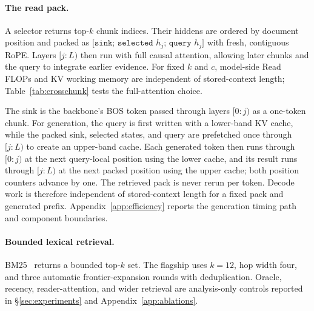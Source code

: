 \paragraph{The read pack.} A selector returns top-$k$ chunk indices. Their
hiddens are ordered by document position and packed as
$\texttt{[sink; selected }h_j\texttt{; query }h_j\texttt{]}$ with fresh,
contiguous RoPE. Layers $[j{:}L)$ then run with full causal attention, allowing
later chunks and the query to integrate earlier evidence. For fixed $k$ and $c$,
model-side Read FLOPs and KV working memory are independent of stored-context
length; Table~\ref{tab:crosschunk} tests the full-attention choice.

The sink is the backbone's BOS token passed through layers $[0{:}j)$ as a
one-token chunk. For generation, the query is first written with a lower-band KV
cache, while the packed sink, selected states, and query are prefetched once
through $[j{:}L)$ to create an upper-band cache. Each generated token then runs
through $[0{:}j)$ at the next query-local position using the lower cache, and its
result runs through $[j{:}L)$ at the next packed position using the upper cache;
both position counters advance by one. The retrieved pack is never rerun per
token. Decode work is therefore independent of stored-context length for a fixed
pack and generated prefix. Appendix~\ref{app:efficiency} reports the generation
timing path and component boundaries.

\paragraph{Bounded lexical retrieval.} BM25~\citep{bm25} returns a bounded
top-$k$ set. The flagship uses $k{=}12$, hop width four, and three automatic
frontier-expansion
rounds with deduplication. Oracle, recency, reader-attention, and wider retrieval
are analysis-only controls reported in \S\ref{sec:experiments} and
Appendix~\ref{app:ablations}.
